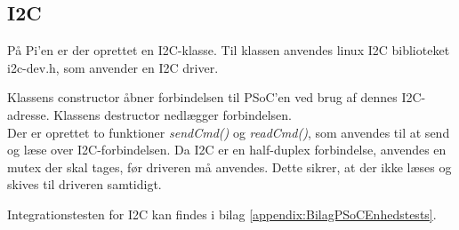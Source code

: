 %

%

\subsection{I2C}

På Pi'en er der oprettet en I2C-klasse. 
Til klassen anvendes linux I2C biblioteket i2c-dev.h, som anvender en I2C driver.

Klassens constructor åbner forbindelsen til PSoC'en ved brug af dennes I2C-adresse. 
Klassens destructor nedlægger forbindelsen. \\
Der er oprettet to funktioner \textit{sendCmd()} og \textit{readCmd()}, som anvendes til at send og læse over I2C-forbindelsen.
Da I2C er en half-duplex forbindelse, anvendes en mutex der skal tages, før driveren må anvendes.
Dette sikrer, at der ikke læses og skives til driveren samtidigt. 

Integrationstesten for I2C kan findes i bilag \ref{appendix:BilagPSoCEnhedstests}.


%